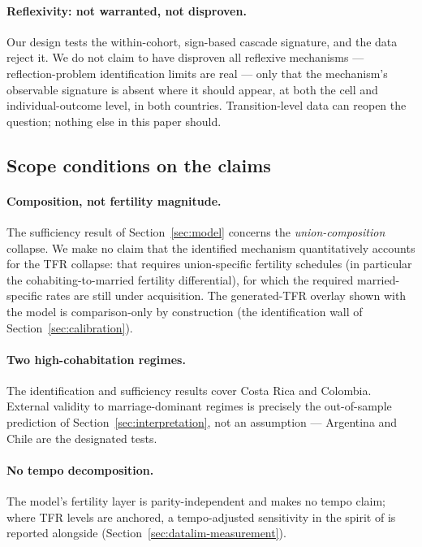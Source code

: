 \paragraph{Reflexivity: not warranted, not disproven.} Our design tests the
within-cohort, sign-based cascade signature, and the data reject it. We do not
claim to have disproven all reflexive mechanisms --- reflection-problem
identification limits are real \citep{manski1993} --- only that the mechanism's
observable signature is absent where it should appear, at both the cell and
individual-outcome level, in both countries. Transition-level data can reopen
the question; nothing else in this paper should.

\subsection{Scope conditions on the claims}

\paragraph{Composition, not fertility magnitude.} The sufficiency result of
Section~\ref{sec:model} concerns the \emph{union-composition} collapse. We make
no claim that the identified mechanism quantitatively accounts for the TFR
collapse: that requires union-specific fertility schedules (in particular the
cohabiting-to-married fertility differential), for which the required
married-specific rates are still under acquisition. The generated-TFR overlay
shown with the model is comparison-only by construction (the identification
wall of Section~\ref{sec:calibration}).

\paragraph{Two high-cohabitation regimes.} The identification and sufficiency
results cover Costa Rica and Colombia. External validity to marriage-dominant
regimes is precisely the out-of-sample prediction of
Section~\ref{sec:interpretation}, not an assumption --- Argentina and Chile are
the designated tests.

\paragraph{No tempo decomposition.} The model's fertility layer is
parity-independent and makes no tempo claim; where TFR levels are anchored, a
tempo-adjusted sensitivity in the spirit of \citet{bongaarts1998} is reported
alongside (Section~\ref{sec:datalim-measurement}).

